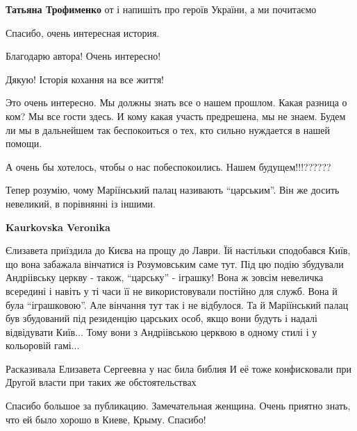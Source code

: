 \begin{itemize}
\begin{itemize}
\begin{itemize}
\end{itemize} %

\textbf{Татьяна Трофименко} от і напишіть про героїв України, а ми почитаємо

\end{itemize} %

Спасибо, очень интересная история.

Благодарю автора! Очень интересно!

Дякую! Історія кохання на все життя!


Это очень интересно. Мы должны знать все о нашем прошлом. Какая разница о ком? Мы
все гости здесь. И кому какая участь предрешена, мы не знаем. Будем ли мы в
дальнейшем так беспокоиться о тех, кто сильно нуждается в нашей помощи.


А очень бы хотелось, чтобы о нас побеспокоились. Нашем будущем!!!??????


Тепер розумію, чому Маріїнський палац називають \enquote{царським}. Він же досить
невеликий, в порівнянні із іншими.

\begin{itemize} %
\textbf{Kaurkovska Veronika} 

Єлизавета приїздила до Києва на прощу до Лаври. Їй настільки сподобався Київ,
що вона забажала вінчатися із Розумовським саме тут. Під цю подію збудували
Андріівську церкву - також, \enquote{царську} - іграшку! Вона ж зовсім невеличка
всередині і навіть у ті часи її не використовували постійно для служб. Вона й
була \enquote{іграшковою}. Але вінчання тут так і не відбулося. Та й Маріїнський палац
був збудований під резиденцію царських особ, якщо вони будуть і надалі
відвідувати Київ... Тому вони з Андріівською церквою в одному стилі і у
кольоровій гамі...

\end{itemize} %

Расказивала Елизавета Сергеевна у нас била библия
И её тоже конфисковали при
Другой власти при таких же обстоятельствах

Спасибо большое за публикацию. Замечательная женщина. Очень приятно знать, что ей было хорошо в Киеве, Крыму. Спасибо!



\end{itemize}
